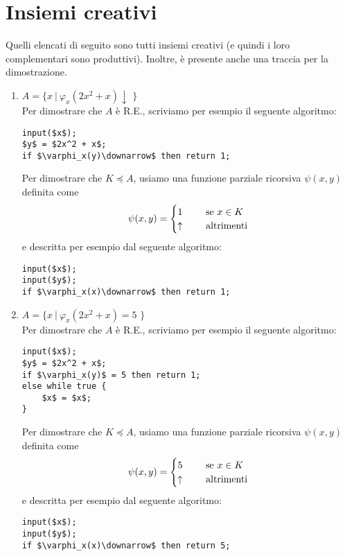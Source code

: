 \documentclass[a4paper,oneside,titlepage]{book}
\begin{document}
\section{Insiemi creativi}
Quelli elencati di seguito sono tutti insiemi creativi (e quindi i loro complementari sono produttivi). Inoltre, è presente anche una traccia per la dimostrazione.
\begin{enumerate}[label=\fbox{\arabic*}]
\item $A = \text{\{ } x \ | \ \varphi_x(2x^2+x)\downarrow \text{ \}}$
\\ Per dimostrare che $A$ è R.E., scriviamo per esempio il seguente algoritmo:
\begin{lstlisting}
input($x$);
$y$ = $2x^2 + x$;
if $\varphi_x(y)\downarrow$ then return 1;
\end{lstlisting}
Per dimostrare che $K \preceq A$, usiamo una funzione parziale ricorsiva $\psi(x,y)$ definita come
\[
\psi(x,y) =
\begin{cases}
1& \hspace{0.5cm} \text{se } x \in K \\
\uparrow& \hspace{0.5cm} \text{altrimenti}
\end{cases}
\]
e descritta per esempio dal seguente algoritmo:
\begin{lstlisting}
input($x$);
input($y$);
if $\varphi_x(x)\downarrow$ then return 1;
\end{lstlisting}

\item $A = \text{\{ } x \ | \ \varphi_x(2x^2+x)=5 \text{ \}}$
\\ Per dimostrare che $A$ è R.E., scriviamo per esempio il seguente algoritmo:
\begin{lstlisting}
input($x$);
$y$ = $2x^2 + x$;
if $\varphi_x(y)$ = 5 then return 1;
else while true {
    $x$ = $x$;
}
\end{lstlisting}
Per dimostrare che $K \preceq A$, usiamo una funzione parziale ricorsiva $\psi(x,y)$ definita come
\[
\psi(x,y) =
\begin{cases}
5& \hspace{0.5cm} \text{se } x \in K \\
\uparrow& \hspace{0.5cm} \text{altrimenti}
\end{cases}
\]
\newpage
e descritta per esempio dal seguente algoritmo:
\begin{lstlisting}
input($x$);
input($y$);
if $\varphi_x(x)\downarrow$ then return 5;
\end{lstlisting}


\end{enumerate}
\end{document}
